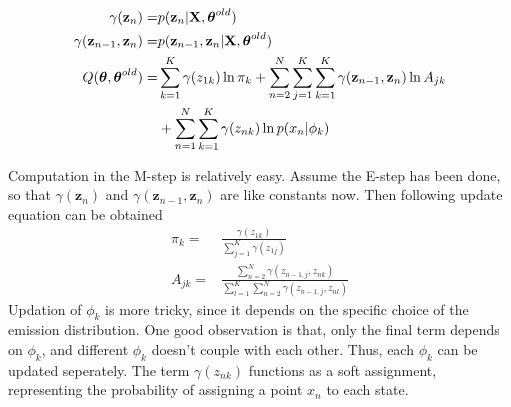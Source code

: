 \begin{align}
	\gamma(\mathbf{z}_n) = &p(\mathbf{z}_n | \mathbf{X}, \boldsymbol{\theta}^{old})	\\
	\gamma(\mathbf{z}_{n-1}, \mathbf{z}_n) = &p(\mathbf{z}_{n-1}, \mathbf{z}_n | \mathbf{X}, \boldsymbol{\theta}^{old}) \\
	Q(\boldsymbol{\theta}, \boldsymbol{\theta}^{old}) = &\sum_{k=1}^{K} \gamma(z_{1k})\ln \pi_k + \sum_{n=2}^{N}\sum_{j=1}^{K}\sum_{k=1}^{K}\gamma(\mathbf{z}_{n-1}, \mathbf{z}_n)\ln A_{jk}		\notag		\\
		&+ \sum_{n=1}^{N}\sum_{k=1}^{K}\gamma(z_{nk})\ln p(x_n|\phi_k)	
\end{align}

Computation in the M-step is relatively easy. Assume the E-step has been done, so that  \(\gamma(\mathbf{z}_n)\) and \(\gamma(\mathbf{z}_{n-1}, \mathbf{z}_n)\) are like constants now. Then following update equation can be obtained
\begin{align}
	\pi_k = & \frac{\gamma(z_{1k})}{\sum_{j=1}^{K}\gamma(z_{1j})}	\\
	A_{jk} = & \frac{\sum_{n=2}^{N}\gamma(z_{n-1,j},z_{nk})}{\sum_{l=1}^{K}\sum_{n=2}^{N}\gamma(z_{n-1,j},z_{nl})}
\end{align}
Updation of \(\phi_k\) is more tricky, since it depends on the specific choice of the emission distribution. One good observation is that, only the final term depends on \(\phi_k\), and different \(\phi_k\) doesn't couple with each other. Thus, each \(\phi_k\) can be updated seperately. The term \(\gamma(z_{nk})\) functions as a soft assignment, representing the probability of assigning a point \(x_n\) to each state.

